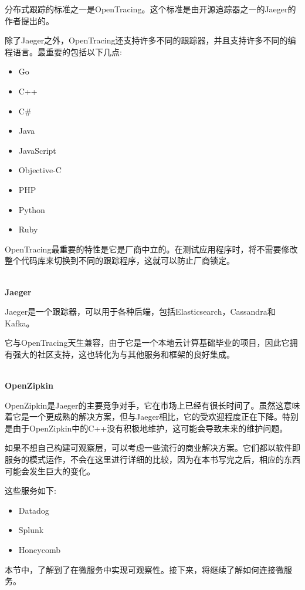 分布式跟踪的标准之一是OpenTracing。这个标准是由开源追踪器之一的Jaeger的作者提出的。

除了Jaeger之外，OpenTracing还支持许多不同的跟踪器，并且支持许多不同的编程语言。最重要的包括以下几点:

\begin{itemize}
\item 
Go

\item 
C++

\item 
C\#

\item 
Java

\item 
JavaScript

\item 
Objective-C

\item 
PHP

\item 
Python

\item 
Ruby
\end{itemize}

OpenTracing最重要的特性是它是厂商中立的。在测试应用程序时，将不需要修改整个代码库来切换到不同的跟踪程序，这就可以防止厂商锁定。

\hspace*{\fill} \\ %
\noindent
\textbf{Jaeger}

Jaeger是一个跟踪器，可以用于各种后端，包括Elasticsearch，Cassandra和Kafka。

它与OpenTracing天生兼容，由于它是一个本地云计算基础毕业的项目，因此它拥有强大的社区支持，这也转化为与其他服务和框架的良好集成。

\hspace*{\fill} \\ %
\noindent
\textbf{OpenZipkin}

OpenZipkin是Jaeger的主要竞争对手，它在市场上已经有很长时间了。虽然这意味着它是一个更成熟的解决方案，但与Jaeger相比，它的受欢迎程度正在下降。特别是由于OpenZipkin中的C++没有积极地维护，这可能会导致未来的维护问题。


如果不想自己构建可观察层，可以考虑一些流行的商业解决方案。它们都以软件即服务的模式运作，不会在这里进行详细的比较，因为在本书写完之后，相应的东西可能会发生巨大的变化。

这些服务如下:

\begin{itemize}
\item 
Datadog

\item 
Splunk

\item 
Honeycomb
\end{itemize}

本节中，了解到了在微服务中实现可观察性。接下来，将继续了解如何连接微服务。













